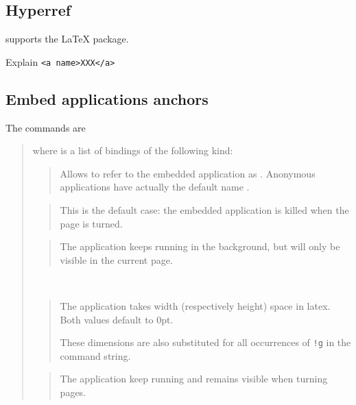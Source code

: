 \documentclass[12pt]{article}
\begin{document}
\subsection {Hyperref}

{\ActiveDVI} supports the  {\LaTeX} package. 

Explain \verb"<a name>XXX</a>"

\subsection {Embed applications anchors}

The commands are 

\medskip\noindent
\docdef \adviembed{} 

\begin{quote}
where  is a list of bindings of the following kind:

\begin{quote}
Allows to refer to the embedded application as . 
Anonymous applications have actually the default name .
\end{quote}


\begin{quote}
This is the default case: the embedded application is killed when the page
is turned.
\end{quote}


\begin{quote}
The application keeps running in the background, but will only be visible in
the current page.
\end{quote}

\\
\begin{quote}
The application takes  width (respectively height) space in 
latex. Both values default to 0pt.

These dimensions are also substituted for all occurrences of \verb"!g" in
the command string.
\end{quote}

\begin{quote}
The application keep running and remains visible when turning pages.
\end{quote}

\end{quote}
\end{document}
